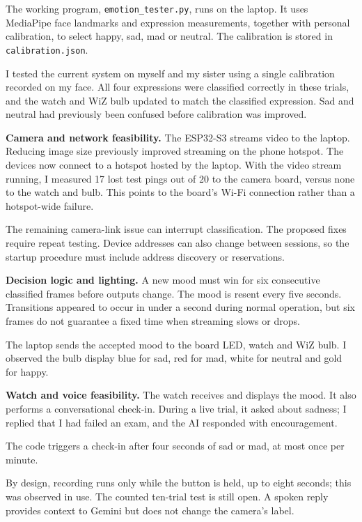 \documentclass[conference,letterpaper]{IEEEtran}
\begin{document}
The working program, \texttt{emotion\_tester.py}, runs on the
laptop. It uses MediaPipe face landmarks and expression
measurements, together with personal calibration, to select happy,
sad, mad or neutral. The calibration is stored in
\texttt{calibration.json}.

I tested the current system on myself and my sister using a single
calibration recorded on my face. All four expressions were classified
correctly in these trials, and the watch and WiZ bulb updated
to match the classified expression. Sad and neutral had previously
been confused before calibration was improved.


\textbf{Camera and network feasibility.}
The ESP32-S3 streams video to the laptop. Reducing image size
previously improved streaming on the phone hotspot.
The devices now connect to a hotspot hosted by the laptop.
With the video stream running, I measured 17 lost test pings out of
20 to the camera board, versus none to the watch and bulb.
This points to the board's Wi-Fi connection rather than a
hotspot-wide failure.

The remaining camera-link issue can interrupt classification.
The proposed fixes require repeat testing. Device addresses can
also change between sessions, so the startup procedure must include
address discovery or reservations.

\textbf{Decision logic and lighting.}
A new mood must win for six consecutive classified frames before
outputs change. The mood is resent every five seconds.
Transitions appeared to occur in under a second during normal
operation, but six frames do not guarantee a fixed time when
streaming slows or drops.

The laptop sends the accepted mood to the board LED, watch and WiZ
bulb. I observed the bulb display blue for sad, red for mad,
white for neutral and gold for happy.




\textbf{Watch and voice feasibility.}
The watch receives and displays the mood. It also performs a
conversational check-in. During a live trial, it asked about sadness;
I replied that I had failed an exam, and the AI responded with
encouragement.

The code triggers a check-in after four seconds of sad or mad,
at most once per minute.

By design, recording runs only while the button is held, up to
eight seconds; this was observed in use. The counted ten-trial
test is still open.
A spoken reply provides context to Gemini but does not change the
camera's label. 
\end{document}
